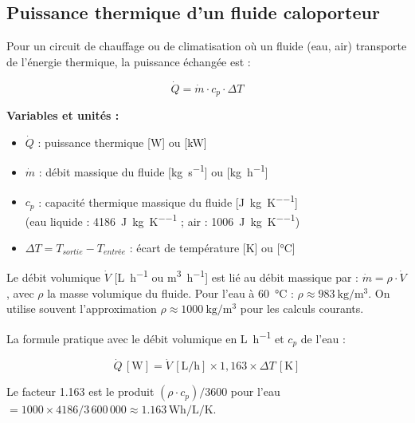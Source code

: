 \subsection{Puissance thermique d'un fluide caloporteur}

Pour un circuit de chauffage ou de climatisation où un fluide (eau, air) transporte de
l'énergie thermique, la puissance échangée est :

\begin{equation}
  \boxed{
    \dot{Q} = \dot{m} \cdot c_p \cdot \Delta T
  }
  \label{eq:puissance_fluide}
\end{equation}

\textbf{Variables et unités :}
\begin{itemize}
  \item \(\dot{Q}\) : puissance thermique [\si{\watt}] ou [\si{\kilo\watt}]
  \item \(\dot{m}\) : débit massique du fluide [\si{\kilogram\per\second}] ou
        [\si{\kilogram\per\hour}]
  \item \(c_p\) : capacité thermique massique du fluide [\si{\joule\per\kilogram\per\kelvin}]
        \\ (eau liquide : \SI{4186}{\joule\per\kilogram\per\kelvin} ;
           air : \SI{1006}{\joule\per\kilogram\per\kelvin})
  \item \(\Delta T = T_{sortie} - T_{entrée}\) : écart de température [\si{\kelvin}] ou
        [\si{\degreeCelsius}]
\end{itemize}

\begin{attention}
  Le débit volumique \(\dot{V}\) [\si{\liter\per\hour} ou \si{\meter\cubed\per\hour}] est
  lié au débit massique par : \(\dot{m} = \rho \cdot \dot{V}\), avec \(\rho\) la masse
  volumique du fluide. Pour l'eau à \SI{60}{\degreeCelsius} : \(\rho \approx
  \SI{983}{\kilogram\per\meter\cubed}\). On utilise souvent l'approximation
  \(\rho \approx \SI{1000}{\kilogram\per\meter\cubed}\) pour les calculs courants.
\end{attention}

La formule pratique avec le débit volumique en \si{\liter\per\hour} et \(c_p\) de l'eau :

\begin{equation}
  \dot{Q}\,[\si{\watt}] = \dot{V}\,[\si{\liter\per\hour}] \times 1{,}163 \times \Delta T\,[\si{\kelvin}]
  \label{eq:formule_pratique_eau}
\end{equation}

Le facteur \num{1,163} est le produit \((\rho \cdot c_p) / 3600\) pour l'eau
\(= 1000 \times 4186 / 3\,600\,000 \approx \num{1,163}\,\si{\watt\hour\per\liter\per\kelvin}\).


